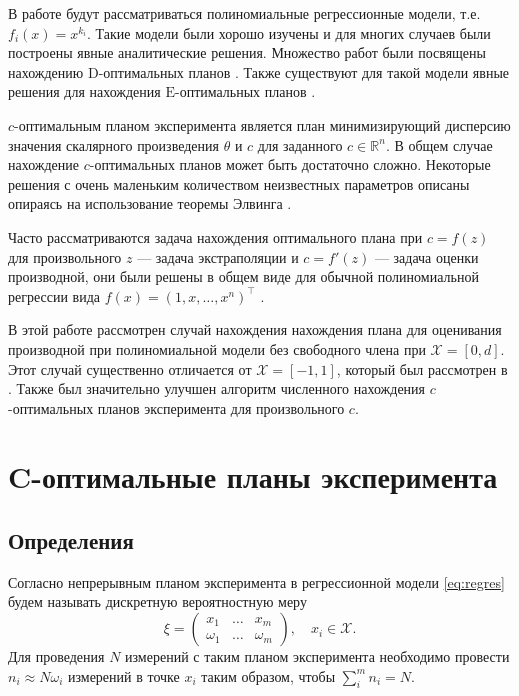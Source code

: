 \documentclass[specialist,
               substylefile = spbu.rtx,
               subf,href,colorlinks=true, 12pt]{disser}
\theoremstyle{definition}
\begin{document}
  В работе будут рассматриваться полиномиальные регрессионные модели, т.е. $f_i(x) = x^{k_i}$. Такие модели были хорошо изучены и для многих случаев были построены явные аналитические решения. Множество работ были посвящены нахождению $\mathrm{D}$-оптимальных планов \cite{hoel1958, studden1980, dette1990, dette2001}. Также существуют для такой модели явные решения для нахождения $\mathrm{E}$-оптимальных планов \cite{pukelsheim1993, dette1993, heiligers1994, dette1993_2}.
  
  $c$-оптимальным планом эксперимента является план минимизирующий дисперсию значения скалярного произведения $\theta$ и $c$ для заданного $c \in \mathbb{R}^n$. В общем случае нахождение $c$-оптимальных планов может быть достаточно сложно. Некоторые решения с очень маленьким количеством неизвестных параметров описаны опираясь на использование теоремы Элвинга \cite{elfving1952}. 
  
  Часто рассматриваются задача нахождения оптимального плана при $c = f(z)$ для произвольного $z$ --- задача экстраполяции и $c = f'(z)$ --- задача оценки производной, они были решены в общем виде для обычной полиномиальной регрессии вида $f(x) = (1, x, \ldots, x^n)^\top$ \cite{hoel1964, melas2010}. 
  
  В этой работе рассмотрен случай нахождения нахождения плана для оценивания производной при полиномиальной модели без свободного члена при $\mathcal{X} = [0, d]$. Этот случай существенно отличается от $\mathcal{X} = [-1, 1]$, который был рассмотрен в \cite{melasmain}. Также был значительно улучшен алгоритм численного нахождения $c$-оптимальных планов эксперимента для произвольного $c$.
  
  

\chapter{C-оптимальные планы эксперимента}

\section{Определения}

Согласно \cite{kiefer1974} непрерывным планом эксперимента в регрессионной модели \eqref{eq:regres} будем называть дискретную вероятностную меру
  \begin{equation*}
    \xi = 
      \begin{pmatrix}
        x_1 & \ldots & x_m \\
        \omega_1 & \ldots & \omega_m
      \end{pmatrix}, \quad x_i \in \mathcal{X}.
  \end{equation*}
  Для проведения $N$ измерений с таким планом эксперимента необходимо провести $n_i \approx N \omega_i$ измерений в точке $x_i$ таким образом, чтобы $\sum^m_i n_i = N$.
\end{document}
